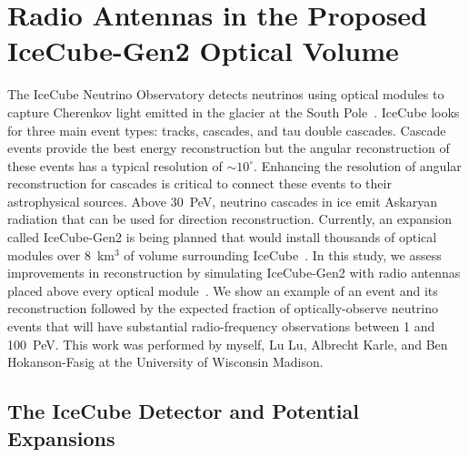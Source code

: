 \chapter{Radio Antennas in the Proposed IceCube-Gen2 Optical Volume \label{chap:gen2_infill}}

  The IceCube Neutrino Observatory detects neutrinos using optical modules to capture Cherenkov light emitted in the glacier at the South Pole~\citep{icecube_search-ehe}.
  IceCube looks for three main event types: tracks, cascades, and tau double cascades. 
  Cascade events provide the best energy reconstruction but the angular reconstruction of these events has a typical resolution of $\sim 10^{\circ}$.
  Enhancing the resolution of angular reconstruction for cascades is critical to connect these events to their astrophysical sources. 
  Above 30~PeV, neutrino cascades in ice emit Askaryan radiation that can be used for direction reconstruction. 
  Currently, an expansion called IceCube-Gen2 is being planned that would install thousands of optical modules over 8~km$^3$ of volume surrounding IceCube~\citep{icecube_gen2}.
  In this study, we assess improvements in reconstruction by simulating IceCube-Gen2 with radio antennas placed above every optical module~\citep{icecube_gen2_infill}. 
  We show an example of an event and its reconstruction followed by the expected fraction of optically-observe neutrino events that will have substantial radio-frequency observations between 1 and 100~PeV.
  This work was performed by myself, Lu Lu, Albrecht Karle, and Ben Hokanson-Fasig at the University of Wisconsin Madison.

\section{The IceCube Detector and Potential Expansions}

